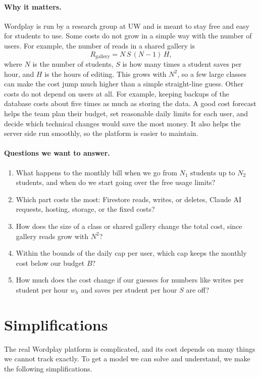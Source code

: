 \documentclass{article}
\begin{document}
\paragraph{Why it matters.}
Wordplay is run by a research group at UW and is meant to stay free and easy for students to use. Some costs do not grow in a simple way with the number of users. For example, the number of reads in a shared gallery is
\[ R_{\text{gallery}} = N\,S\,(N-1)\,H, \]
where $N$ is the number of students, $S$ is how many times a student saves per hour, and $H$ is the hours of editing. This grows with $N^2$, so a few large classes can make the cost jump much higher than a simple straight-line guess. Other costs do not depend on users at all. For example, keeping backups of the database costs about five times as much as storing the data. A good cost forecast helps the team plan their budget, set reasonable daily limits for each user, and decide which technical changes would save the most money. It also helps the server side run smoothly, so the platform is easier to maintain.

\paragraph{Questions we want to answer.}
\begin{enumerate}
    \item What happens to the monthly bill when we go from $N_1$ students up to $N_2$ students, and when do we start going over the free usage limits?
    \item Which part costs the most: Firestore reads, writes, or deletes, Claude AI requests, hosting, storage, or the fixed costs?
    \item How does the size of a class or shared gallery change the total cost, since gallery reads grow with $N^2$?
    \item Within the bounds of the daily cap per user, which cap keeps the monthly cost below our budget $B$?
    \item How much does the cost change if our guesses for numbers like writes per student per hour $w_h$ and saves per student per hour $S$ are off?
\end{enumerate}

\section{Simplifications}

The real Wordplay platform is complicated, and its cost depends on many things we cannot track exactly. To get a model we can solve and understand, we make the following simplifications.
\end{document}
